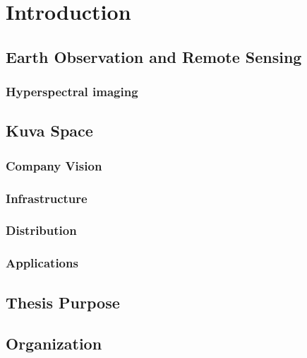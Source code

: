 \chapter{Introduction}


\section{Earth Observation and Remote Sensing}

\subsection{Hyperspectral imaging}

\section{Kuva Space}

\subsection{Company Vision}
\subsection{Infrastructure}
\subsection{Distribution}
\subsection{Applications}

\section{Thesis Purpose}

\section{Organization}